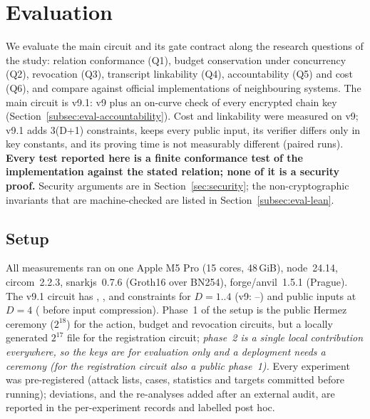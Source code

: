 

\section{Evaluation}
\label{sec:experiments}

We evaluate the main circuit and its gate contract along the research questions of the study: relation conformance (Q1), budget
conservation under concurrency (Q2), revocation (Q3), transcript linkability (Q4), accountability (Q5) and cost (Q6), and compare against official
implementations of neighbouring systems. The main circuit is v9.1: v9 plus an on-curve check of every encrypted chain key (Section~\ref{subsec:eval-accountability}).
Cost and linkability were measured on v9; v9.1 adds 3(D+1) constraints, keeps every public input, its verifier differs only in key constants, and
its proving time is not measurably different (paired runs).
\textbf{Every test reported here is a finite conformance test of the implementation against the stated relation; none of it is a security proof.}
Security arguments are in Section~\ref{sec:security}; the non-cryptographic invariants that are machine-checked are listed in
Section~\ref{subsec:eval-lean}.

\subsection{Setup}
\label{subsec:eval-setup}
All measurements ran on one Apple M5 Pro (15 cores, 48\,GiB), node~24.14, circom~2.2.3, snarkjs~0.7.6 (Groth16 over BN254), forge/anvil~1.5.1
(Prague). The v9.1 circuit has \NConsVnineOneA, \NConsVnineOneB, \NConsVnineOneC{} and \NConsVnineOneD{} constraints for $D=1..4$ (v9: \NConsVnineA--\NConsVnineD) and \NPubVnineD{} public inputs
at $D=4$ (\NPubVeightD{} before input compression). Phase~1 of the setup is the public Hermez ceremony ($2^{18}$) for the action, budget and revocation circuits, but a locally generated $2^{17}$
file for the registration circuit; \emph{phase~2 is a single local contribution everywhere, so the keys are for evaluation only and a deployment
needs a ceremony (for the registration circuit also a public phase~1).} Every experiment was pre-registered (attack lists,
cases, statistics and targets committed before running); deviations, and the re-analyses added after an external audit, are reported in the
per-experiment records and labelled post hoc.

